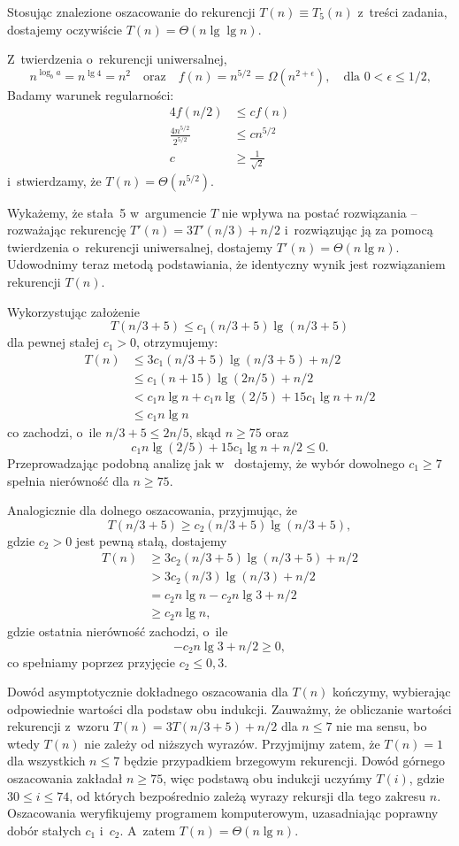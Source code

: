 Stosując znalezione oszacowanie do rekurencji $T(n)\equiv T_5(n)$ z~treści zadania, dostajemy oczywiście $T(n)=\Theta(n\lg\lg n)$.

\subproblem %
Z~twierdzenia o~rekurencji uniwersalnej,
\[
	n^{\log_ba} = n^{\lg4} = n^2 \quad\text{oraz}\quad f(n) = n^{5/2} = \Omega(n^{2+\epsilon}), \quad\text{dla $0<\epsilon\le1/2$,}
\]
Badamy warunek regularności:
\begin{align*}
	4f(n/2) &\le cf(n) \\
	\frac{4n^{5/2}}{2^{5/2}} &\le cn^{5/2} \\
	c &\ge \frac{1}{\sqrt{2}}
\end{align*}
i~stwierdzamy, że $T(n)=\Theta(n^{5/2})$.

\subproblem %
Wykażemy, że stała~5 w~argumencie $T$ nie wpływa na postać rozwiązania -- rozważając rekurencję $T'(n)=3T'(n/3)+n/2$ i~rozwiązując ją za pomocą twierdzenia o~rekurencji uniwersalnej, dostajemy $T'(n)=\Theta(n\lg n)$. Udowodnimy teraz metodą podstawiania, że identyczny wynik jest rozwiązaniem rekurencji $T(n)$.

Wykorzystując założenie
\[
	T(n/3+5) \le c_1(n/3+5)\lg(n/3+5)
\]
dla pewnej stałej $c_1>0$, otrzymujemy:
\begin{align*}
	T(n) &\le 3c_1(n/3+5)\lg(n/3+5)+n/2 \\
	&\le c_1(n+15)\lg(2n/5)+n/2 \\
	&< c_1n\lg n+c_1n\lg(2/5)+15c_1\!\lg n+n/2 \\
	&\le c_1n\lg n
\end{align*}
co zachodzi, o~ile $n/3+5\le2n/5$, skąd $n\ge75$ oraz
\[
	c_1n\lg(2/5)+15c_1\!\lg n+n/2 \le 0.
\]
Przeprowadzając podobną analizę jak w~ dostajemy, że wybór dowolnego $c_1\ge7$ spełnia nierówność dla $n\ge75$.

Analogicznie dla dolnego oszacowania, przyjmując, że
\[
	T(n/3+5) \ge c_2(n/3+5)\lg(n/3+5),
\]
gdzie $c_2>0$ jest pewną stałą, dostajemy
\begin{align*}
	T(n) &\ge 3c_2(n/3+5)\lg(n/3+5)+n/2 \\
	&> 3c_2(n/3)\lg(n/3)+n/2 \\
	&= c_2n\lg n-c_2n\lg3+n/2 \\
	&\ge c_2n\lg n,
\end{align*}
gdzie ostatnia nierówność zachodzi, o~ile
\[
	-c_2n\lg3+n/2 \ge 0,
\]
co spełniamy poprzez przyjęcie $c_2\le0{,}3$.

Dowód asymptotycznie dokładnego oszacowania dla $T(n)$ kończymy, wybierając odpowiednie wartości dla podstaw obu indukcji. Zauważmy, że obliczanie wartości rekurencji z~wzoru $T(n)=3T(n/3+5)+n/2$ dla $n\le7$ nie ma sensu, bo wtedy $T(n)$ nie zależy od niższych wyrazów. Przyjmijmy zatem, że $T(n)=1$ dla wszystkich $n\le7$ będzie przypadkiem brzegowym rekurencji. Dowód górnego oszacowania zakładał $n\ge75$, więc podstawą obu indukcji uczyńmy $T(i)$, gdzie $30\le i\le 74$, od których bezpośrednio zależą wyrazy rekursji dla tego zakresu $n$. Oszacowania weryfikujemy programem komputerowym, uzasadniając poprawny dobór stałych $c_1$ i~$c_2$. A~zatem $T(n)=\Theta(n\lg n)$.

